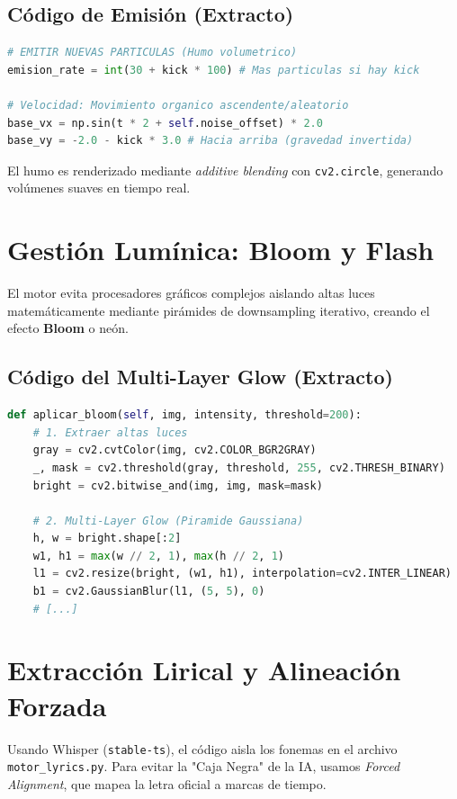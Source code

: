 \documentclass[12pt]{book}
\begin{document}
\section{Código de Emisión (Extracto)}
\begin{lstlisting}[language=Python]
# EMITIR NUEVAS PARTICULAS (Humo volumetrico)
emision_rate = int(30 + kick * 100) # Mas particulas si hay kick

# Velocidad: Movimiento organico ascendente/aleatorio
base_vx = np.sin(t * 2 + self.noise_offset) * 2.0
base_vy = -2.0 - kick * 3.0 # Hacia arriba (gravedad invertida)
\end{lstlisting}
El humo es renderizado mediante \textit{additive blending} con \texttt{cv2.circle}, generando volúmenes suaves en tiempo real.

\chapter{Gestión Lumínica: Bloom y Flash}
El motor evita procesadores gráficos complejos aislando altas luces matemáticamente mediante pirámides de downsampling iterativo, creando el efecto \textbf{Bloom} o neón.

\section{Código del Multi-Layer Glow (Extracto)}
\begin{lstlisting}[language=Python]
def aplicar_bloom(self, img, intensity, threshold=200):
    # 1. Extraer altas luces
    gray = cv2.cvtColor(img, cv2.COLOR_BGR2GRAY)
    _, mask = cv2.threshold(gray, threshold, 255, cv2.THRESH_BINARY)
    bright = cv2.bitwise_and(img, img, mask=mask)
    
    # 2. Multi-Layer Glow (Piramide Gaussiana)
    h, w = bright.shape[:2]
    w1, h1 = max(w // 2, 1), max(h // 2, 1)
    l1 = cv2.resize(bright, (w1, h1), interpolation=cv2.INTER_LINEAR)
    b1 = cv2.GaussianBlur(l1, (5, 5), 0)
    # [...]
\end{lstlisting}

\chapter{Extracción Lirical y Alineación Forzada}
Usando Whisper (\texttt{stable-ts}), el código aisla los fonemas en el archivo \texttt{motor\_lyrics.py}. Para evitar la "Caja Negra" de la IA, usamos \textit{Forced Alignment}, que mapea la letra oficial a marcas de tiempo.
\end{document}
